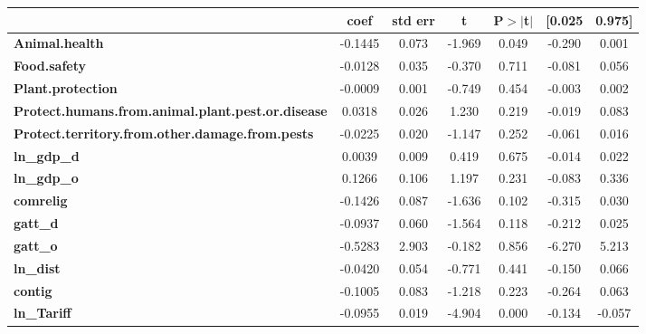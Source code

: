 \begin{center}
\begin{tabular}{lcccccc}
                                                          & \textbf{coef} & \textbf{std err} & \textbf{t} & \textbf{P$> |$t$|$} & \textbf{[0.025} & \textbf{0.975]}  \\
\midrule
\textbf{Animal.health}                                    &      -0.1445  &        0.073     &    -1.969  &         0.049        &       -0.290    &        0.001     \\
\textbf{Food.safety}                                      &      -0.0128  &        0.035     &    -0.370  &         0.711        &       -0.081    &        0.056     \\
\textbf{Plant.protection}                                 &      -0.0009  &        0.001     &    -0.749  &         0.454        &       -0.003    &        0.002     \\
\textbf{Protect.humans.from.animal.plant.pest.or.disease} &       0.0318  &        0.026     &     1.230  &         0.219        &       -0.019    &        0.083     \\
\textbf{Protect.territory.from.other.damage.from.pests}   &      -0.0225  &        0.020     &    -1.147  &         0.252        &       -0.061    &        0.016     \\
\textbf{ln\_gdp\_d}                                       &       0.0039  &        0.009     &     0.419  &         0.675        &       -0.014    &        0.022     \\
\textbf{ln\_gdp\_o}                                       &       0.1266  &        0.106     &     1.197  &         0.231        &       -0.083    &        0.336     \\
\textbf{comrelig}                                         &      -0.1426  &        0.087     &    -1.636  &         0.102        &       -0.315    &        0.030     \\
\textbf{gatt\_d}                                          &      -0.0937  &        0.060     &    -1.564  &         0.118        &       -0.212    &        0.025     \\
\textbf{gatt\_o}                                          &      -0.5283  &        2.903     &    -0.182  &         0.856        &       -6.270    &        5.213     \\
\textbf{ln\_dist}                                         &      -0.0420  &        0.054     &    -0.771  &         0.441        &       -0.150    &        0.066     \\
\textbf{contig}                                           &      -0.1005  &        0.083     &    -1.218  &         0.223        &       -0.264    &        0.063     \\
\textbf{ln\_Tariff}                                       &      -0.0955  &        0.019     &    -4.904  &         0.000        &       -0.134    &       -0.057     \\
\bottomrule
\end{tabular}
\end{center}